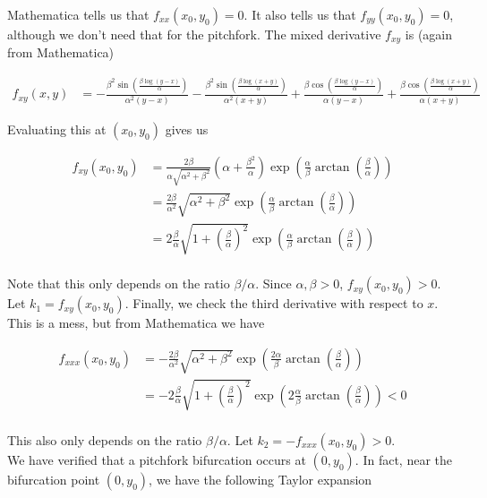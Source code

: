 \documentclass[12pt]{article}
\begin{document}
\begin{enumerate}
Mathematica tells us that $f_{xx}(x_0, y_0) = 0$. It also tells us that $f_{yy}(x_0, y_0) = 0$, although we don't need that for the pitchfork. The mixed derivative $f_{xy}$ is (again from Mathematica)

\begin{align*}
f_{xy}(x, y) &= -\frac{\beta^2 \sin \left(\frac{\beta \log (y-x)}{\alpha}\right)}{\alpha^2 (y-x)}-\frac{\beta^2 \sin
   \left(\frac{\beta \log (x+y)}{\alpha}\right)}{\alpha^2 (x+y)}+\frac{\beta \cos \left(\frac{\beta \log
   (y-x)}{\alpha}\right)}{\alpha (y-x)}+\frac{\beta \cos \left(\frac{\beta \log (x+y)}{\alpha}\right)}{\alpha (x+y)}
\end{align*}

Evaluating this at $(x_0, y_0)$ gives us

\begin{align*}
f_{xy}(x_0, y_0) &= \frac{2\beta}{\alpha\sqrt{\alpha^2 + \beta^2}} \left( \alpha + \frac{\beta^2}{\alpha} \right)\exp\left( \frac{\alpha}{\beta} \arctan \left( \frac{\beta}{\alpha}\right) \right) \\
&= \frac{2 \beta}{\alpha^2}\sqrt{ \alpha^2 + \beta^2 }
\exp\left( \frac{\alpha}{\beta} \arctan \left( \frac{\beta}{\alpha}\right) \right) \\
&= 2 \frac{\beta}{\alpha}\sqrt{ 1 + \left(\frac{\beta}{\alpha}\right)^2 }
\exp\left( \frac{\alpha}{\beta} \arctan \left( \frac{\beta}{\alpha}\right) \right) \\
\end{align*}

Note that this only depends on the ratio $\beta / \alpha$. Since $\alpha, \beta > 0$, $f_{xy}(x_0, y_0) > 0$. Let $k_1 = f_{xy}(x_0, y_0)$. Finally, we check the third derivative with respect to $x$. This is a mess, but from Mathematica we have

\begin{align*}
f_{xxx}(x_0, y_0)
&= -\frac{2 \beta}{\alpha^2}\sqrt{ \alpha^2 + \beta^2 }
\exp\left( \frac{2\alpha}{\beta} \arctan \left( \frac{\beta}{\alpha}\right) \right) \\
&= -2 \frac{\beta}{\alpha}\sqrt{ 1 + \left(\frac{\beta}{\alpha}\right)^2 }
\exp\left( 2 \frac{\alpha}{\beta} \arctan \left( \frac{\beta}{\alpha}\right) \right) < 0\\
\end{align*}

This also only depends on the ratio $\beta / \alpha$. Let $k_2 = -f_{xxx}(x_0, y_0) > 0$. \\

We have verified that a pitchfork bifurcation occurs at $(0, y_0)$. In fact, near the bifurcation point $(0, y_0)$, we have the following Taylor expansion


\end{enumerate}
\end{document}
